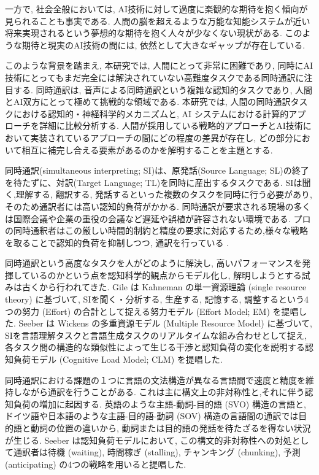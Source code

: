 一方で, 社会全般においては, AI技術に対して過度に楽観的な期待を抱く傾向が見られることも事実である.
人間の脳を超えるような万能な知能システムが近い将来実現されるという夢想的な期待を抱く人々が少なくない現状がある.
このような期待と現実のAI技術の間には, 依然として大きなギャップが存在している.

このような背景を踏まえ, 本研究では, 人間にとって非常に困難であり, 同時にAI技術にとってもまだ完全には解決されていない高難度タスクである同時通訳に注目する.
同時通訳は, 音声による同時通訳という複雑な認知的タスクであり, 人間とAI双方にとって極めて挑戦的な領域である.
本研究では, 人間の同時通訳タスクにおける認知的・神経科学的メカニズムと, AI システムにおける計算的アプローチを詳細に比較分析する.
人間が採用している戦略的アプローチとAI技術において実装されているアプローチの間にどの程度の差異が存在し, どの部分において相互に補完し合える要素があるのかを解明することを主題とする.

同時通訳(simultaneous interpreting; SI)は、原発話(Source Language; SL)の終了を待たずに、対訳(Target Language; TL)を同時に産出するタスクである.
SIは聞く,理解する, 翻訳する, 発話するといった複数のタスクを同時に行う必要があり, そのため通訳者には高い認知的負荷がかかる. 
同時通訳が要求される現場の多くは国際会議や企業の重役の会議など遅延や誤植が許容されない環境である.
プロの同時通釈者はこの厳しい時間的制約と精度の要求に対応するため,様々な戦略を取ることで認知的負荷を抑制しつつ, 通訳を行っている \cite{seeber2011cognitive} .

同時通訳という高度なタスクを人がどのように解決し, 高いパフォーマンスを発揮しているのかという点を認知科学的観点からモデル化し, 解明しようとする試みは古くから行われてきた.
Gile \cite{gile1995regards, gile1997conference} は Kahneman \cite{kahneman1973attention} の単一資源理論 (single resource theory) に基づいて, SIを聞く・分析する, 生産する, 記憶する, 調整するという4つの努力 (Effort) の合計として捉える努力モデル (Effort Model; EM) を提唱した.
Seeber \cite{seeber2011cognitive} は Wickens \cite{wickens1984processing, wickens2002multiple} の多重資源モデル (Multiple Resource Model) に基づいて, SIを言語理解タスクと言語生成タスクのリアルタイムな組み合わせとして捉え, 各タスク間の構造的な類似性によって生じる干渉と認知負荷の変化を説明する認知負荷モデル (Cognitive Load Model; CLM) を提唱した.

同時通訳における課題の１つに言語の文法構造が異なる言語間で速度と精度を維持しながら通訳を行うことがある.
これは主に構文上の非対称性と,それに伴う認知負荷の増加に起因する.
英語のような主語-動詞-目的語 (SVO) 構造の言語と, ドイツ語や日本語のような主語-目的語-動詞 (SOV) 構造の言語間の通訳では目的語と動詞の位置の違いから, 動詞または目的語の発話を待たざるを得ない状況が生じる.
Seeber \cite{seeber2011cognitive} は認知負荷モデルにおいて, この構文的非対称性への対処として通訳者は待機 (waiting), 時間稼ぎ (stalling), チャンキング (chunking), 予測 (anticipating) の4つの戦略を用いると提唱した.


